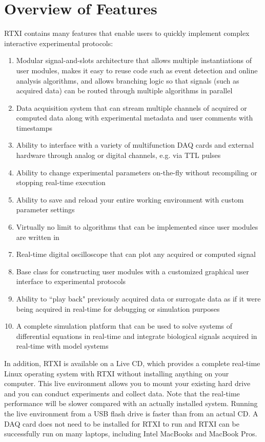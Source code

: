 \section{Overview of Features}
RTXI contains many features that enable users to quickly implement complex interactive experimental protocols:
\begin{enumerate}
\item Modular signal-and-slots architecture that allows multiple instantiations of user modules, makes it easy to reuse code such as event detection and online analysis algorithms, and allows branching logic so that signals (such as acquired data) can be routed through multiple algorithms in parallel
\item Data acquisition system that can stream multiple channels of acquired or computed data along with experimental metadata and user comments with timestamps
\item Ability to interface with a variety of multifunction DAQ cards and external hardware through analog or digital channels, e.g. via TTL pulses
\item Ability to change experimental parameters on-the-fly without recompiling or stopping real-time execution
\item Ability to save and reload your entire working environment with custom parameter settings
\item Virtually no limit to algorithms that can be implemented since user modules are written in \cpp
\item Real-time digital oscilloscope that can plot any acquired or computed signal
\item Base class for constructing user modules with a customized graphical user interface to experimental protocols
\item Ability to ``play back" previously acquired data or surrogate data as if it were being acquired in real-time for debugging or simulation purposes
\item A complete simulation platform that can be used to solve systems of differential equations in real-time and integrate biological signals acquired in real-time with model systems
\end{enumerate}

In addition, RTXI is available on a Live CD, which provides a complete real-time Linux operating system with RTXI without installing anything on your computer. This live environment allows you to mount your existing hard drive and you can conduct experiments and collect data. Note that the real-time performance will be slower compared with an actually installed system. Running the live environment from a USB flash drive is faster than from an actual CD. A DAQ card does not need to be installed for RTXI to run and RTXI can be successfully run on many laptops, including Intel MacBooks and MacBook Pros.